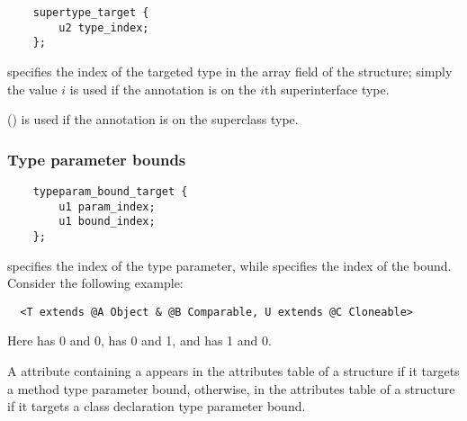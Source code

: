\documentclass[10pt]{article}
\begin{document}

\preverbnegspace
\begin{Verbatim}
    supertype_target {
        u2 type_index;
    };
\end{Verbatim}

 specifies the index of the targeted type in the
 array field of the  structure;
simply the value $i$ is used if the annotation is on the $i$th
superinterface type.

 () is used if the annotation is on the superclass type.



\subsubsection{Type parameter bounds\label{class-file:ext:ri:tpbound}}


\preverbnegspace
\begin{Verbatim}
    typeparam_bound_target {
        u1 param_index;
        u1 bound_index;
    };
\end{Verbatim}

 specifies the index of the type parameter, while
 specifies the index of the bound.  Consider the following
example:

\preverbnegspace
\begin{Verbatim}
  <T extends @A Object & @B Comparable, U extends @C Cloneable>
\end{Verbatim}

\noindent
Here
 has  0 and  0,
 has  0 and  1, and
 has  1 and  0.

A \RuntimeInOrVisibleTypeAnnotations attribute containing a
 appears in the attributes table of a
 structure if it targets a method type parameter bound,
otherwise, in the attributes table of a  structure if it
targets a class declaration type parameter bound.
\end{document}
